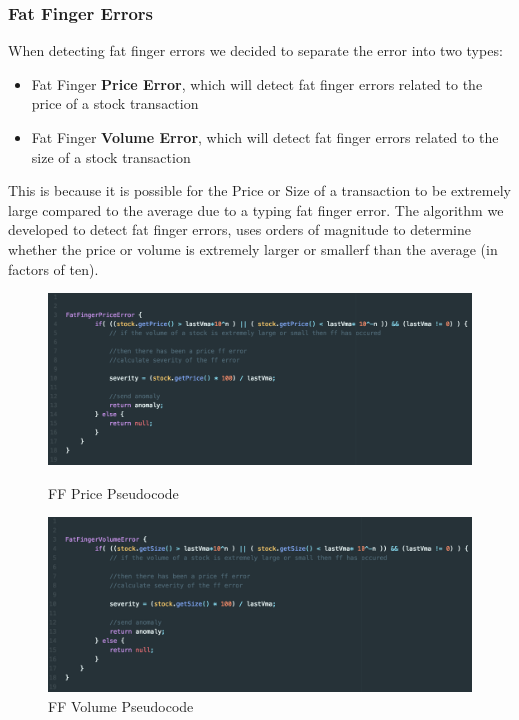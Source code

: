 \documentclass[12pt]{article}
\begin{document}
    \subsubsection{Fat Finger Errors}
    When detecting fat finger errors we decided to separate the error into two types:
    \begin{itemize}
      \itemsep0em
      \item Fat Finger \textbf{Price Error}, which will detect fat finger errors related to the price of a stock transaction
      \item Fat Finger \textbf{Volume Error}, which will detect fat finger errors related to the size of a stock transaction
    \end{itemize}
    This is because it is possible for the Price or Size of a transaction to be extremely large compared to the average due to a typing fat finger error.
    The algorithm we developed to detect fat finger errors, uses orders of magnitude to determine whether the price or volume is extremely larger or smallerf than the average (in factors of ten).
    \begin{figure}[H]
      \centering
      \begin{minipage}{0.4\textwidth}
        \includegraphics[width=\textwidth]{FFprice.png}
        \caption{FF Price Pseudocode}
      \end{minipage}
      \begin{minipage}{0.4\textwidth}
        \includegraphics[width=\textwidth]{FFvolume.png}
        \caption{FF Volume Pseudocode}
      \end{minipage}
    \end{figure}
\end{document}
